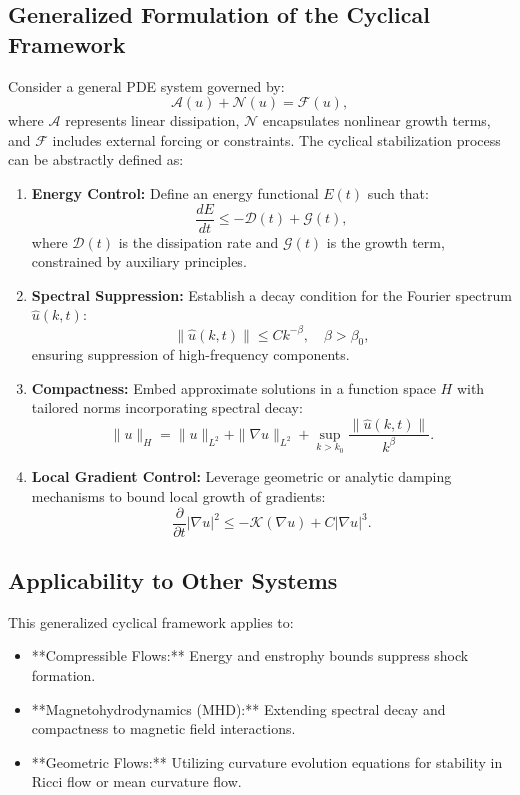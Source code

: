 \subsection{Generalized Formulation of the Cyclical Framework}
Consider a general PDE system governed by:
\begin{equation}
\mathcal{A}(u) + \mathcal{N}(u) = \mathcal{F}(u),
\end{equation}
where $\mathcal{A}$ represents linear dissipation, $\mathcal{N}$ encapsulates nonlinear growth terms, and $\mathcal{F}$ includes external forcing or constraints. The cyclical stabilization process can be abstractly defined as:
\begin{enumerate}
    \item \textbf{Energy Control:} Define an energy functional $E(t)$ such that:
    \begin{equation}
    \frac{dE}{dt} \leq -\mathcal{D}(t) + \mathcal{G}(t),
    \end{equation}
    where $\mathcal{D}(t)$ is the dissipation rate and $\mathcal{G}(t)$ is the growth term, constrained by auxiliary principles.
    \item \textbf{Spectral Suppression:} Establish a decay condition for the Fourier spectrum $\hat{u}(k, t)$:
    \begin{equation}
    \|\hat{u}(k, t)\| \leq Ck^{-\beta}, \quad \beta > \beta_0,
    \end{equation}
    ensuring suppression of high-frequency components.
    \item \textbf{Compactness:} Embed approximate solutions in a function space $H$ with tailored norms incorporating spectral decay:
    \begin{equation}
    \|u\|_H = \|u\|_{L^2} + \|\nabla u\|_{L^2} + \sup_{k > k_0} \frac{\|\hat{u}(k, t)\|}{k^\beta}.
    \end{equation}
    \item \textbf{Local Gradient Control:} Leverage geometric or analytic damping mechanisms to bound local growth of gradients:
    \begin{equation}
    \frac{\partial}{\partial t} |\nabla u|^2 \leq -\mathcal{K}(\nabla u) + C|\nabla u|^3.
    \end{equation}
\end{enumerate}
\subsection{Applicability to Other Systems}
This generalized cyclical framework applies to:
\begin{itemize}
    \item **Compressible Flows:** Energy and enstrophy bounds suppress shock formation.
    \item **Magnetohydrodynamics (MHD):** Extending spectral decay and compactness to magnetic field interactions.
    \item **Geometric Flows:** Utilizing curvature evolution equations for stability in Ricci flow or mean curvature flow.
\end{itemize}

